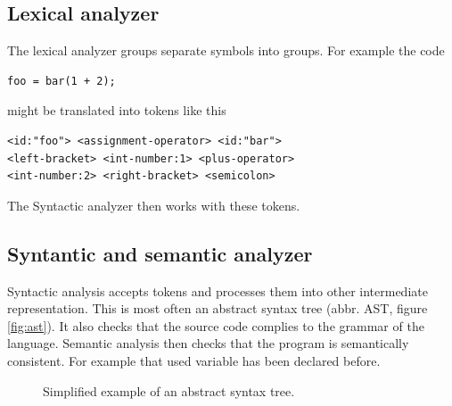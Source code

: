 \subsection{Lexical analyzer}
The lexical analyzer groups separate symbols into groups. For example the code
\begin{verbatim}
foo = bar(1 + 2);
\end{verbatim}
might be translated into tokens like this
\begin{lstlisting}[stringstyle=\color{black}]
<id:"foo"> <assignment-operator> <id:"bar"> 
<left-bracket> <int-number:1> <plus-operator> 
<int-number:2> <right-bracket> <semicolon>
\end{lstlisting}
The Syntactic analyzer then works with these tokens.

\subsection{Syntantic and semantic analyzer}
Syntactic analysis accepts tokens and processes them into other intermediate
representation. This is most often an abstract syntax tree (abbr. AST, figure
\ref{fig:ast}). It also checks that the source code complies to the grammar of
the language. Semantic analysis then checks that the program is semantically
consistent. For example that used variable has been declared before.

\begin{figure}\label{fig:ast}
    \centering
    \caption{Simplified example of an abstract syntax tree.}
    \label{fig:astgraph}
\end{figure}
 
